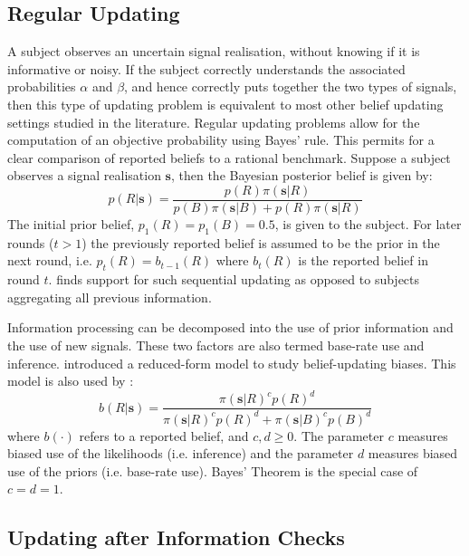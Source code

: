 \documentclass{article}
\begin{document}
\subsection{Regular Updating}

A subject observes an uncertain signal realisation, without knowing if it is informative or noisy. If the subject correctly understands the associated probabilities $\alpha$ and $\beta$, and hence correctly puts together the two types of signals, then this type of updating problem is equivalent to most other belief updating settings studied in the literature. Regular updating problems allow for the computation of an objective probability using Bayes' rule. This permits for a clear comparison of reported beliefs to a rational benchmark. Suppose a subject observes a signal realisation $\mathbf{s}$, then the Bayesian posterior belief is given by:
\begin{equation}
\label{eq-bayes}
p(R|\mathbf{s})=\frac{p(R)\pi(\mathbf{s}|R)}{p(B)\pi(\mathbf{s}|B)+p(R)\pi(\mathbf{s}|R)}    
\end{equation}
The initial prior belief, $p_1(R)=p_1(B)=0.5$, is given to the subject. For later rounds ($t>1$) the previously reported belief is assumed to be the prior in the next round, i.e. $p_t(R)=b_{t-1}(R)$ where $b_t(R)$ is the reported belief in round $t$. \cite{Benjamin2019}  finds support for such sequential updating as opposed to subjects aggregating all previous information.

Information processing can be decomposed into the use of prior information and the use of new signals. These two factors are also termed base-rate use and inference. \cite{Grether1980} introduced a reduced-form model to study belief-updating biases. This model is also used by \cite{Benjamin2019}:
\begin{equation}
\label{eq-benjamin}
b(R|\mathbf{s})=\frac{\pi(\mathbf{s}|R)^c p(R)^d}{\pi(\mathbf{s}|R)^c p(R)^d + \pi(\mathbf{s}|B)^c p(B)^d}    
\end{equation}
where $b(\cdot)$ refers to a reported belief, and $c,d\geq 0$. The parameter $c$ measures biased use of the likelihoods (i.e. inference) and the parameter $d$ measures biased use of the priors (i.e. base-rate use). Bayes' Theorem is the special case of $c=d=1$.

\subsection{Updating after Information Checks}
\end{document}
